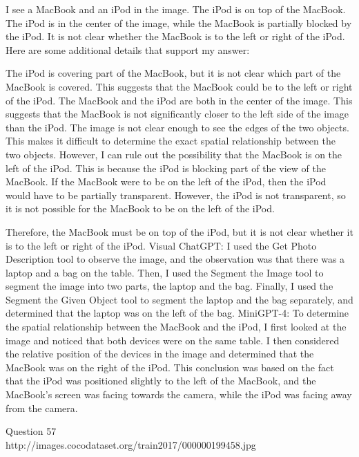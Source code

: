 \begin{enumerate}
    I see a MacBook and an iPod in the image.
    The iPod is on top of the MacBook.
    The iPod is in the center of the image, while the MacBook is partially blocked by the iPod.
    It is not clear whether the MacBook is to the left or right of the iPod.
    Here are some additional details that support my answer:
    
    The iPod is covering part of the MacBook, but it is not clear which part of the MacBook is covered. This suggests that the MacBook could be to the left or right of the iPod.
    The MacBook and the iPod are both in the center of the image. This suggests that the MacBook is not significantly closer to the left side of the image than the iPod.
    The image is not clear enough to see the edges of the two objects. This makes it difficult to determine the exact spatial relationship between the two objects.
    However, I can rule out the possibility that the MacBook is on the left of the iPod. This is because the iPod is blocking part of the view of the MacBook. If the MacBook were to be on the left of the iPod, then the iPod would have to be partially transparent. However, the iPod is not transparent, so it is not possible for the MacBook to be on the left of the iPod.
    
    Therefore, the MacBook must be on top of the iPod, but it is not clear whether it is to the left or right of the iPod.
    \subitem Visual ChatGPT: I used the Get Photo Description tool to observe the image, and the observation was that there was a laptop and a bag on the table. Then, I used the Segment the Image tool to segment the image into two parts, the laptop and the bag. Finally, I used the Segment the Given Object tool to segment the laptop and the bag separately, and determined that the laptop was on the left of the bag.
    \subitem MiniGPT-4: To determine the spatial relationship between the MacBook and the iPod, I first looked at the image and noticed that both devices were on the same table. I then considered the relative position of the devices in the image and determined that the MacBook was on the right of the iPod. This conclusion was based on the fact that the iPod was positioned slightly to the left of the MacBook, and the MacBook’s screen was facing towards the camera, while the iPod was facing away from the camera.
\end{enumerate}
Question 57\\
http://images.cocodataset.org/train2017/000000199458.jpg
